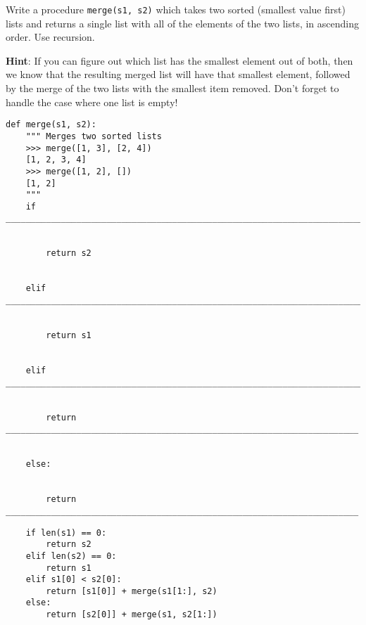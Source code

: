 \question Write a procedure {\tt merge(s1, s2)} which takes two sorted (smallest
value first) lists and returns a single list with all of the elements of the two
lists, in ascending order. Use recursion.

\textbf{Hint}: If you can figure out which list has the smallest element out of
both, then we know that the resulting merged list will have that smallest
element, followed by the merge of the two lists with the smallest item
removed. Don't forget to handle the case where one list is empty!

\begin{lstlisting}
def merge(s1, s2):
    """ Merges two sorted lists
    >>> merge([1, 3], [2, 4])
    [1, 2, 3, 4]
    >>> merge([1, 2], [])
    [1, 2]
    """
    if ______________________________________________________________________________:


        return s2


    elif ____________________________________________________________________________:


        return s1


    elif ____________________________________________________________________________:


        return ______________________________________________________________________


    else:


        return ______________________________________________________________________
\end{lstlisting}
\begin{solution}[1.5in]
\begin{lstlisting}
    if len(s1) == 0:
        return s2
    elif len(s2) == 0:
        return s1
    elif s1[0] < s2[0]:
        return [s1[0]] + merge(s1[1:], s2)
    else:
        return [s2[0]] + merge(s1, s2[1:])
\end{lstlisting}
\end{solution}
